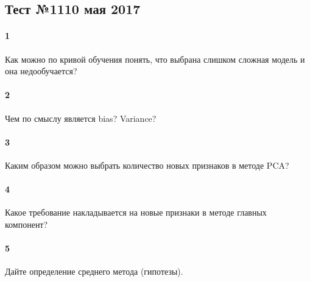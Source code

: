 \documentclass[a4paper,12pt]{article}
\begin{document}
  \subsection*{Тест №11\hfill{10 мая 2017}}

  
  \paragraph{1} Как можно по кривой обучения понять, что выбрана слишком сложная модель и она недообучается?

  \makebox[\linewidth]{\hrulefill}
  \makebox[\linewidth]{\hrulefill}

  \paragraph{2} Чем по смыслу является bias? Variance?
	
  \makebox[\linewidth]{\hrulefill}
  \makebox[\linewidth]{\hrulefill}
  \makebox[\linewidth]{\hrulefill}
	
  \paragraph{3} Каким образом можно выбрать количество новых признаков в методе PCA?

  \makebox[\linewidth]{\hrulefill}
  \makebox[\linewidth]{\hrulefill}
  \makebox[\linewidth]{\hrulefill}
  \makebox[\linewidth]{\hrulefill}

  \paragraph{4} Какое требование накладывается на новые признаки в методе главных компонент?

  \makebox[\linewidth]{\hrulefill}
  \makebox[\linewidth]{\hrulefill}
  \makebox[\linewidth]{\hrulefill}
  \makebox[\linewidth]{\hrulefill}

  \paragraph{5} Дайте определение среднего метода (гипотезы).

  \makebox[\linewidth]{\hrulefill}
  \makebox[\linewidth]{\hrulefill}
  \makebox[\linewidth]{\hrulefill}
  \makebox[\linewidth]{\hrulefill}
  \makebox[\linewidth]{\hrulefill}
 
\end{document}
